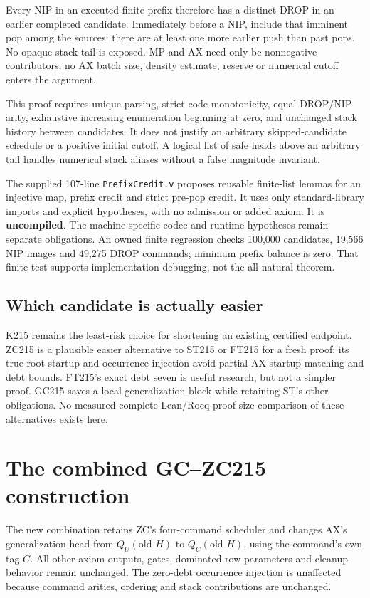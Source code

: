 \documentclass[11pt]{article}
\begin{document}
Every NIP in an executed finite prefix therefore has a distinct DROP in an earlier completed candidate. Immediately before a NIP, include that imminent pop among the sources: there are at least one more earlier push than past pops. No opaque stack tail is exposed. MP and AX need only be nonnegative contributors; no AX batch size, density estimate, reserve or numerical cutoff enters the argument.

This proof requires unique parsing, strict code monotonicity, equal DROP/NIP arity, exhaustive increasing enumeration beginning at zero, and unchanged stack history between candidates. It does not justify an arbitrary skipped-candidate schedule or a positive initial cutoff. A logical list of safe heads above an arbitrary tail handles numerical stack aliases without a false magnitude invariant.

The supplied 107-line \texttt{PrefixCredit.v} proposes reusable finite-list lemmas for an injective map, prefix credit and strict pre-pop credit. It uses only standard-library imports and explicit hypotheses, with no admission or added axiom. It is \textbf{uncompiled}. The machine-specific codec and runtime hypotheses remain separate obligations. An owned finite regression checks 100,000 candidates, 19,566 NIP images and 49,275 DROP commands; minimum prefix balance is zero. That finite test supports implementation debugging, not the all-natural theorem.

\subsection{Which candidate is actually easier}
K215 remains the least-risk choice for shortening an existing certified endpoint. ZC215 is a plausible easier alternative to ST215 or FT215 for a fresh proof: its true-root startup and occurrence injection avoid partial-AX startup matching and debt bounds. FT215's exact debt seven is useful research, but not a simpler proof. GC215 saves a local generalization block while retaining ST's other obligations. No measured complete Lean/Rocq proof-size comparison of these alternatives exists here.

\section{The combined GC--ZC215 construction}
The new combination retains ZC's four-command scheduler and changes AX's generalization head from $Q_U(\text{old }H)$ to $Q_C(\text{old }H)$, using the command's own tag $C$. All other axiom outputs, gates, dominated-row parameters and cleanup behavior remain unchanged. The zero-debt occurrence injection is unaffected because command arities, ordering and stack contributions are unchanged.
\end{document}
